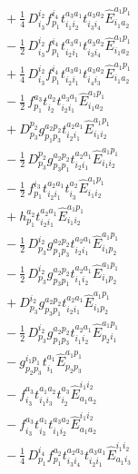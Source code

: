 \documentclass[11pt]{article}
\begin{document}
\begin{align}
&\quad + \tfrac{1}{4}\, D^{i_{2}}_{i_{3}} f^{i_{4}}_{p_{1}} t^{a_{3}a_{1}}_{i_{1}i_{2}} t^{a_{3}a_{2}}_{i_{3}i_{4}} \hat{E}^{a_{1}p_{1}}_{i_{1}a_{2}} \\
&\quad - \tfrac{1}{2}\, D^{i_{2}}_{i_{3}} f^{i_{4}}_{p_{1}} t^{a_{3}a_{1}}_{i_{2}i_{1}} t^{a_{3}a_{2}}_{i_{3}i_{4}} \hat{E}^{a_{1}p_{1}}_{i_{1}a_{2}} \\
&\quad + \tfrac{1}{4}\, D^{i_{2}}_{i_{3}} f^{i_{4}}_{p_{1}} t^{a_{3}a_{1}}_{i_{2}i_{1}} t^{a_{3}a_{2}}_{i_{4}i_{3}} \hat{E}^{a_{1}p_{1}}_{i_{1}a_{2}} \\
&\quad - \tfrac{1}{2}\, f^{a_{3}}_{p_{1}} t^{a_{2}}_{i_{2}} t^{a_{3}a_{1}}_{i_{2}i_{1}} \hat{E}^{a_{1}p_{1}}_{i_{1}a_{2}} \\
&\quad + D^{p_{2}}_{p_{3}} g^{a_{2}p_{2}}_{p_{1}p_{3}} t^{a_{2}a_{1}}_{i_{2}i_{1}} \hat{E}^{a_{1}p_{1}}_{i_{1}i_{2}} \\
&\quad - \tfrac{1}{2}\, D^{p_{2}}_{p_{3}} g^{a_{2}p_{2}}_{p_{3}p_{1}} t^{a_{2}a_{1}}_{i_{2}i_{1}} \hat{E}^{a_{1}p_{1}}_{i_{1}i_{2}} \\
&\quad - \tfrac{1}{2}\, f^{i_{3}}_{p_{1}} t^{a_{2}a_{1}}_{i_{2}i_{1}} t^{a_{2}}_{i_{3}} \hat{E}^{a_{1}p_{1}}_{i_{1}i_{2}} \\
&\quad + h^{a_{2}}_{p_{1}} t^{a_{2}a_{1}}_{i_{2}i_{1}} \hat{E}^{a_{1}p_{1}}_{i_{1}i_{2}} \\
&\quad - \tfrac{1}{2}\, D^{i_{2}}_{p_{3}} g^{a_{2}p_{2}}_{p_{1}p_{3}} t^{a_{2}a_{1}}_{i_{2}i_{1}} \hat{E}^{a_{1}p_{1}}_{i_{1}p_{2}} \\
&\quad - \tfrac{1}{2}\, D^{i_{2}}_{p_{3}} g^{a_{2}p_{2}}_{p_{3}p_{1}} t^{a_{2}a_{1}}_{i_{1}i_{2}} \hat{E}^{a_{1}p_{1}}_{i_{1}p_{2}} \\
&\quad + D^{i_{2}}_{p_{3}} g^{a_{2}p_{2}}_{p_{3}p_{1}} t^{a_{2}a_{1}}_{i_{2}i_{1}} \hat{E}^{a_{1}p_{1}}_{i_{1}p_{2}} \\
&\quad - \tfrac{1}{2}\, D^{i_{2}}_{p_{3}} g^{a_{2}p_{2}}_{p_{1}p_{3}} t^{a_{2}a_{1}}_{i_{1}i_{2}} \hat{E}^{a_{1}p_{1}}_{p_{2}i_{1}} \\
&\quad - g^{i_{1}p_{1}}_{p_{2}p_{3}} t^{a_{1}}_{i_{1}} \hat{E}^{a_{1}p_{1}}_{p_{2}p_{3}} \\
&\quad - f^{a_{3}}_{i_{3}} t^{a_{1}a_{2}}_{i_{1}i_{3}} t^{a_{3}}_{i_{2}} \hat{E}^{i_{1}i_{2}}_{a_{1}a_{2}} \\
&\quad - f^{a_{3}}_{i_{3}} t^{a_{1}}_{i_{3}} t^{a_{3}a_{2}}_{i_{1}i_{2}} \hat{E}^{i_{1}i_{2}}_{a_{1}a_{2}} \\
&\quad - \tfrac{1}{4}\, D^{i_{4}}_{p_{1}} f^{a_{2}}_{p_{1}} t^{a_{2}a_{3}}_{i_{3}i_{4}} t^{a_{3}a_{1}}_{i_{2}i_{1}} \hat{E}^{i_{1}i_{2}}_{a_{1}i_{3}} \\

\end{align}
\end{document}
